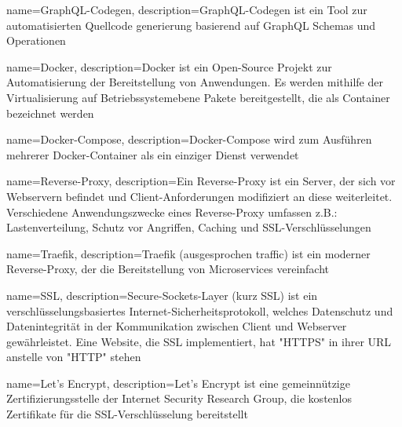 {   name={GraphQL-Codegen},
    description={GraphQL-Codegen ist ein Tool zur automatisierten Quellcode generierung basierend auf GraphQL Schemas und Operationen}
}

{   name={Docker},
    description={Docker ist ein Open-Source Projekt zur Automatisierung der Bereitstellung von Anwendungen. Es werden mithilfe der Virtualisierung auf Betriebssystemebene Pakete bereitgestellt, die als Container bezeichnet werden}
}

{   name={Docker-Compose},
    description={Docker-Compose wird zum Ausführen mehrerer Docker-Container als ein einziger Dienst verwendet}
}

{   name={Reverse-Proxy},
    description={Ein Reverse-Proxy ist ein Server, der sich vor Webservern befindet und Client-Anforderungen modifiziert an diese weiterleitet. Verschiedene Anwendungszwecke eines Reverse-Proxy umfassen z.B.: Lastenverteilung, Schutz vor Angriffen, Caching und SSL-Verschlüsselungen}
}

{   name={Traefik},
    description={Traefik (ausgesprochen traffic) ist ein moderner Reverse-Proxy, der die Bereitstellung von Microservices vereinfacht}
}

{   name={SSL},
    description={Secure-Sockets-Layer (kurz SSL) ist ein verschlüsselungsbasiertes Internet-Sicherheitsprotokoll, welches Datenschutz und Datenintegrität in der Kommunikation zwischen Client und Webserver gewährleistet. Eine Website, die SSL implementiert, hat "HTTPS" in ihrer URL anstelle von "HTTP" stehen}
}

{   name={Let's Encrypt},
    description={Let's Encrypt ist eine gemeinnützige Zertifizierungsstelle der Internet Security Research Group, die kostenlos Zertifikate für die SSL-Verschlüsselung bereitstellt}
}
